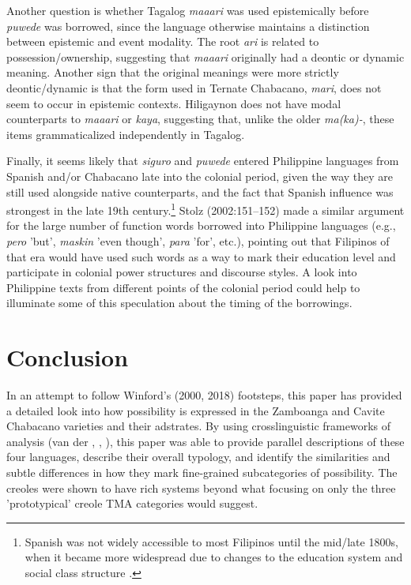Another question is whether Tagalog \textit{maaari} was used epistemically before \textit{puwede} was borrowed, since the language otherwise maintains a distinction between epistemic and event modality. The root \textit{ari} is related to possession/ownership, suggesting that \textit{maaari} originally had a deontic or dynamic meaning. Another sign that the original meanings were more strictly deontic/dynamic is that the form used in Ternate Chabacano, \textit{mari}, does not seem to occur in epistemic contexts. Hiligaynon does not have modal counterparts to \textit{maaari} or \textit{kaya}, suggesting that, unlike the older \textit{ma(ka)-}, these items grammaticalized independently in Tagalog. 

Finally, it seems likely that \textit{siguro} and \textit{puwede} entered Philippine languages from Spanish and/or Chabacano late into the colonial period, given the way they are still used alongside native counterparts, and the fact that Spanish influence was strongest in the late 19th century.\footnote{Spanish was not widely accessible to most Filipinos until the mid/late 1800s, when it became more widespread due to changes to the education system and social class structure \citep[5]{Lesho2018}.}  Stolz (2002:151–152) made a similar argument for the large number of function words borrowed into Philippine languages (e.g., \textit{pero} 'but', \textit{maskin} 'even though', \textit{para} 'for', etc.), pointing out that Filipinos of that era would have used such words as a way to mark their education level and participate in colonial power structures and discourse styles. A look into Philippine texts from different points of the colonial period could help to illuminate some of this speculation about the timing of the borrowings.

\section{Conclusion}

In an attempt to follow Winford's (2000, 2018) footsteps, this paper has provided a detailed look into how possibility is expressed in the Zamboanga and Cavite Chabacano varieties and their adstrates. By using crosslinguistic frameworks of analysis (van der \citealt{AuweraPlungian1998}, \citealt{Palmer2001}, \citealt{MatthewsonEtAl2005}), this paper was able to provide parallel descriptions of these four languages, describe their overall typology, and identify the similarities and subtle differences in how they mark fine-grained subcategories of possibility. The creoles were shown to have rich systems beyond what focusing on only the three 'prototypical' creole TMA categories would suggest. 

